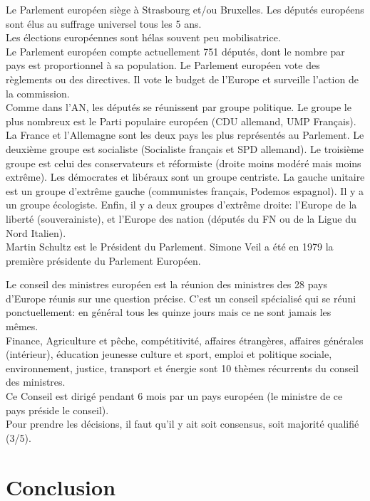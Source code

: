 \documentclass[12pt, a4paper, openany]{book}
\begin{document}
Le Parlement européen siège à Strasbourg et/ou Bruxelles. Les députés européens sont élus au suffrage universel tous les 5 ans. \\
Les élections européennes sont hélas souvent peu mobilisatrice.  \\
Le Parlement européen compte actuellement 751 députés, dont le nombre par pays est proportionnel à sa population. Le Parlement européen vote des règlements ou des directives. Il vote le budget de l'Europe et surveille l'action de la commission. \\
Comme dans l'AN, les députés se réunissent par groupe politique. Le groupe le plus nombreux est le Parti populaire européen (CDU allemand, UMP Français). La France et l'Allemagne sont les deux pays les plus représentés au Parlement. Le deuxième groupe est socialiste (Socialiste français et SPD allemand). Le troisième groupe est celui des conservateurs et réformiste (droite moins modéré mais moins extrême). Les démocrates et libéraux sont un groupe centriste. La gauche unitaire est un groupe d'extrême gauche (communistes français, Podemos espagnol). Il y a un groupe écologiste. Enfin, il y a deux groupes d'extrême droite: l'Europe de la liberté (souverainiste), et l'Europe des nation (députés du FN ou de la Ligue du Nord Italien). \\
Martin Schultz est le Président du Parlement. Simone Veil a été en 1979 la première présidente du Parlement Européen. 


Le conseil des ministres européen est la réunion des ministres des 28 pays d'Europe réunis sur une question précise. C'est un conseil spécialisé qui se réuni ponctuellement: en général tous les quinze jours mais ce ne sont jamais les mêmes. \\
Finance, Agriculture et pêche, compétitivité, affaires étrangères, affaires générales (intérieur), éducation jeunesse culture et sport, emploi et politique sociale, environnement, justice, transport et énergie sont 10 thèmes récurrents du conseil des ministres. \\
Ce Conseil est dirigé pendant 6 mois par un pays européen (le ministre de ce pays préside le conseil). \\
Pour prendre les décisions, il faut qu'il y ait soit consensus, soit majorité qualifié (3/5). 

\section{Conclusion}
\end{document}
